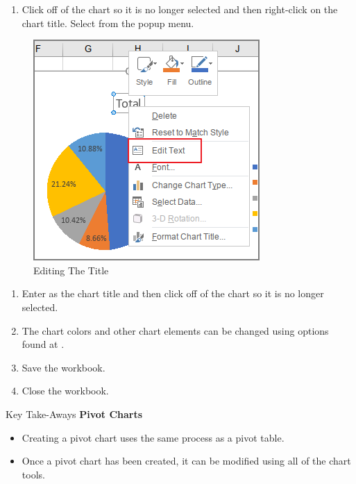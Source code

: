 \begin{enumerate}[resume]	
	\item Click off of the chart so it is no longer selected and then right-click on the chart title. Select  from the popup menu.
\end{enumerate}

\begin{figure}[H]
	\centering
	\includegraphics[width=\maxwidth{.75\linewidth}]{gfx/ch07_fig32}
	\caption{Editing The Title}
	\label{07:fig32}
\end{figure}

\begin{enumerate}[resume]	
	\item Enter  as the chart title and then click off of the chart so it is no longer selected.
	\item The chart colors and other chart elements can be changed using options found at .
	\item Save the  workbook.
	\item Close the  workbook.
\end{enumerate}

\begin{center}
	\begin{tkwbox}{Key Take-Aways}
		\textbf{Pivot Charts}
		\\
		\begin{itemize}
			\setlength{\itemsep}{0pt}
			\setlength{\parskip}{0pt}
			\setlength{\parsep}{0pt}
			
			\item Creating a pivot chart uses the same process as a pivot table.
			\item Once a pivot chart has been created, it can be modified using all of the chart tools.
			
		\end{itemize}
	\end{tkwbox}
\end{center}

